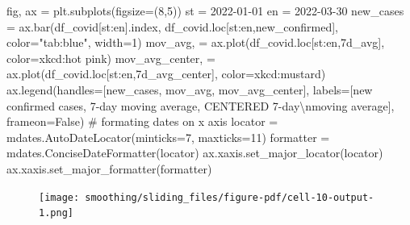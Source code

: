 \documentclass[
  letterpaper,
  DIV=11,
  numbers=noendperiod,
  oneside]{scrreprt}
\newenvironment{Shaded}{\begin{snugshade}}{\end{snugshade}}
\newcommand{\CharTok}[1]{\textcolor[rgb]{0.13,0.47,0.30}{#1}}
\newcommand{\CommentTok}[1]{\textcolor[rgb]{0.37,0.37,0.37}{#1}}
\newcommand{\DecValTok}[1]{\textcolor[rgb]{0.68,0.00,0.00}{#1}}
\newcommand{\NormalTok}[1]{\textcolor[rgb]{0.00,0.23,0.31}{#1}}
\newcommand{\OperatorTok}[1]{\textcolor[rgb]{0.37,0.37,0.37}{#1}}
\newcommand{\StringTok}[1]{\textcolor[rgb]{0.13,0.47,0.30}{#1}}
\newcommand{\VariableTok}[1]{\textcolor[rgb]{0.07,0.07,0.07}{#1}}
\begin{document}
\begin{Shaded}
\begin{Highlighting}[]
\NormalTok{fig, ax }\OperatorTok{=}\NormalTok{ plt.subplots(figsize}\OperatorTok{=}\NormalTok{(}\DecValTok{8}\NormalTok{,}\DecValTok{5}\NormalTok{))}
\NormalTok{st }\OperatorTok{=} \StringTok{\textquotesingle{}2022{-}01{-}01\textquotesingle{}}
\NormalTok{en }\OperatorTok{=} \StringTok{\textquotesingle{}2022{-}03{-}30\textquotesingle{}}
\NormalTok{new\_cases }\OperatorTok{=}\NormalTok{ ax.bar(df\_covid[st:en].index, df\_covid.loc[st:en,}\StringTok{\textquotesingle{}new\_confirmed\textquotesingle{}}\NormalTok{],}
\NormalTok{       color}\OperatorTok{=}\StringTok{"tab:blue"}\NormalTok{, width}\OperatorTok{=}\DecValTok{1}\NormalTok{)}
\NormalTok{mov\_avg, }\OperatorTok{=}\NormalTok{ ax.plot(df\_covid.loc[st:en,}\StringTok{\textquotesingle{}7d\_avg\textquotesingle{}}\NormalTok{],}
\NormalTok{        color}\OperatorTok{=}\StringTok{\textquotesingle{}xkcd:hot pink\textquotesingle{}}\NormalTok{)}
\NormalTok{mov\_avg\_center, }\OperatorTok{=}\NormalTok{ ax.plot(df\_covid.loc[st:en,}\StringTok{\textquotesingle{}7d\_avg\_center\textquotesingle{}}\NormalTok{],}
\NormalTok{                          color}\OperatorTok{=}\StringTok{\textquotesingle{}xkcd:mustard\textquotesingle{}}\NormalTok{)}
\NormalTok{ax.legend(handles}\OperatorTok{=}\NormalTok{[new\_cases, mov\_avg, mov\_avg\_center],}
\NormalTok{          labels}\OperatorTok{=}\NormalTok{[}\StringTok{\textquotesingle{}new confirmed cases\textquotesingle{}}\NormalTok{,}
                  \StringTok{\textquotesingle{}7{-}day moving average\textquotesingle{}}\NormalTok{,}
                  \StringTok{\textquotesingle{}CENTERED 7{-}day}\CharTok{\textbackslash{}n}\StringTok{moving average\textquotesingle{}}\NormalTok{],}
\NormalTok{          frameon}\OperatorTok{=}\VariableTok{False}\NormalTok{)}
\CommentTok{\# formating dates on x axis}
\NormalTok{locator }\OperatorTok{=}\NormalTok{ mdates.AutoDateLocator(minticks}\OperatorTok{=}\DecValTok{7}\NormalTok{, maxticks}\OperatorTok{=}\DecValTok{11}\NormalTok{)}
\NormalTok{formatter }\OperatorTok{=}\NormalTok{ mdates.ConciseDateFormatter(locator)}
\NormalTok{ax.xaxis.set\_major\_locator(locator)}
\NormalTok{ax.xaxis.set\_major\_formatter(formatter)}
\end{Highlighting}
\end{Shaded}

\begin{figure}[H]

{\centering \texttt{[image: smoothing/sliding\_files/figure-pdf/cell-10-output-1.png]}

}

\end{figure}
\end{document}
